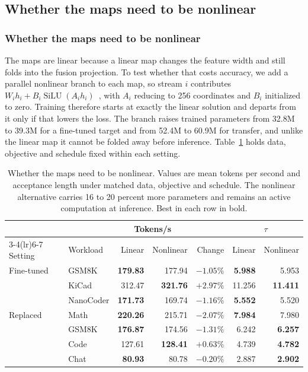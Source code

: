 \subsection{Whether the maps need to be nonlinear}
\label{app:capacity}

\subsubsection{Whether the maps need to be nonlinear}
\label{sec:ablation-capacity}
The maps are linear because a linear map changes the feature width and still folds into the fusion projection. To test whether that costs accuracy, we add a parallel nonlinear branch to each map, so stream $i$ contributes $W_ih_i+B_i\operatorname{SiLU}(A_ih_i)$~\citep{elfwing2018silu}, with $A_i$ reducing to 256 coordinates and $B_i$ initialized to zero. Training therefore starts at exactly the linear solution and departs from it only if that lowers the loss. The branch raises trained parameters from 32.8M to 39.3M for a fine-tuned target and from 52.4M to 60.9M for transfer, and unlike the linear map it cannot be folded away before inference. Table~\ref{tab:ablation-capacity} holds data, objective and schedule fixed within each setting.

\begin{table}[t]
\centering
\caption{Whether the maps need to be nonlinear. Values are mean tokens per second and acceptance length under matched data, objective and schedule. The nonlinear alternative carries 16 to 20 percent more parameters and remains an active computation at inference. Best in each row in bold.}
\label{tab:ablation-capacity}
\small
\begin{tabular}{llrrrrr}
\toprule
& & \multicolumn{2}{c}{Tokens/s} & & \multicolumn{2}{c}{$\tau$} \\
\cmidrule(lr){3-4}\cmidrule(lr){6-7}
Setting & Workload & Linear & Nonlinear & Change & Linear & Nonlinear \\
\midrule
Fine-tuned & GSM8K & \textbf{179.83} & 177.94 & $-1.05\%$ & \textbf{5.988} & 5.953 \\
 & KiCad & 312.47 & \textbf{321.76} & $+2.97\%$ & 11.256 & \textbf{11.411} \\
 & NanoCoder & \textbf{171.73} & 169.74 & $-1.16\%$ & \textbf{5.552} & 5.520 \\
\midrule
Replaced & Math & \textbf{220.26} & 215.71 & $-2.07\%$ & \textbf{7.984} & 7.980 \\
 & GSM8K & \textbf{176.87} & 174.56 & $-1.31\%$ & 6.242 & \textbf{6.257} \\
 & Code & 127.61 & \textbf{128.41} & $+0.63\%$ & 4.739 & \textbf{4.782} \\
 & Chat & \textbf{80.93} & 80.78 & $-0.20\%$ & 2.887 & \textbf{2.902} \\
\bottomrule
\end{tabular}
\end{table}

